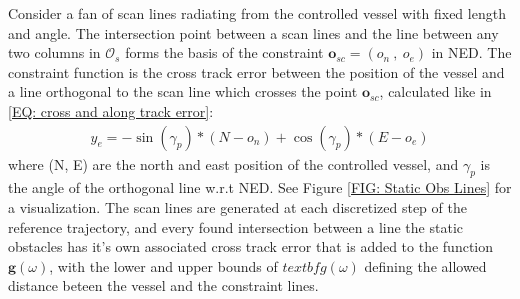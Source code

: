 Consider a fan of scan lines radiating from the controlled vessel with fixed length and angle. The intersection
point between a scan lines and the line between any two columns in $\mathcal{O}_s$ forms the basis of the constraint 
$\mathbf{o}_{sc} = (o_n \ , \ o_e)$ in NED.\newline
The constraint function is the cross track error between the position of the vessel and a line orthogonal to the scan line which crosses
the point $\mathbf{o}_{sc}$, calculated like in \eqref{EQ: cross and along track error}:
\begin{eqnarray}
    y_e = -\sin(\gamma_p)*(N-o_n) + \cos(\gamma_p)*(E-o_e)
\end{eqnarray}
where (N, E) are the north and east position of the controlled vessel, and $\gamma_p$ is the angle of the orthogonal line w.r.t NED.
See Figure \ref{FIG: Static Obs Lines} for a visualization.
The scan lines are generated at each discretized step of the reference trajectory, and every found intersection between a 
line the static obstacles has it's own associated cross track error that is added to the function 
$\textbf{g}(\omega)$, with the lower and upper bounds of $textbf{g}(\omega)$ defining the allowed distance beteen the vessel and the constraint lines.





